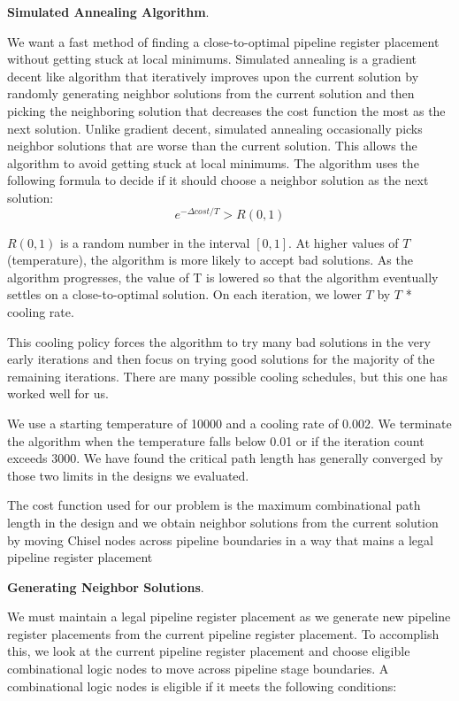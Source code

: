 {\bf Simulated Annealing Algorithm}.

We want a fast method of finding a close-to-optimal pipeline register placement without getting stuck at local minimums. Simulated annealing is a gradient decent like algorithm that iteratively improves upon the current solution by randomly generating neighbor solutions from the current solution and then picking the neighboring solution that decreases the cost function the most as the next solution. Unlike gradient decent, simulated annealing occasionally picks neighbor solutions that are worse than the current solution. This allows the algorithm to avoid getting stuck at local minimums. The algorithm uses the following formula to decide if it should choose a neighbor solution as the next solution:
$$
e^{-\Delta cost/T} > R(0,1)
$$


$R(0,1)$ is a random number in the interval $[0, 1]$. At higher values of $T$ (temperature), the algorithm is more likely to accept bad solutions. As the algorithm progresses, the value of T is lowered so that the algorithm eventually settles on a close-to-optimal solution. On each iteration, we lower $T$ by $T$ * cooling rate.


This cooling policy forces the algorithm to try many bad solutions in the very early iterations and then focus on trying good solutions for the majority of the remaining iterations. There are many possible cooling schedules, but this one has worked well for us.

We use a starting temperature of 10000 and a cooling rate of 0.002. We terminate the algorithm when the temperature falls below 0.01 or if the iteration count exceeds 3000. We have found the critical path length has generally converged by those two limits in the designs we evaluated.

The cost function used for our problem is the maximum combinational path length in the design and we obtain neighbor solutions from the current solution by moving Chisel nodes across pipeline boundaries in a way that mains a legal pipeline register placement


{\bf Generating Neighbor Solutions}.

We must maintain a legal pipeline register placement as we generate new pipeline register placements from the current pipeline register placement. To accomplish this, we look at the current pipeline register placement and choose eligible combinational logic nodes to move across pipeline stage boundaries. A combinational logic nodes is eligible if it meets the following conditions:

